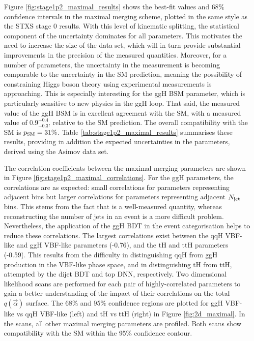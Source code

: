 Figure \ref{fig:stage1p2_maximal_results} shows the \xsbr best-fit values and 68\% confidence intervals in the maximal merging scheme, plotted in the same style as the STXS stage 0 results. With this level of kinematic splitting, the statistical component of the uncertainty dominates for all parameters. This motivates the need to increase the size of the data set, which will in turn provide substantial improvements in the precision of the measured quantities. Moreover, for a number of parameters, the uncertainty in the measurement is becoming comparable to the uncertainty in the SM prediction, meaning the possibility of constraining Higgs boson theory using experimental measurements is approaching. This is especially interesting for the ggH BSM parameter, which is particularly sensitive to new physics in the ggH loop. That said, the measured value of the ggH BSM \xsbr is in excellent agreement with the SM, with a measured value of $0.9^{+0.4}_{-0.3}$, relative to the SM prediction. The overall compatibility with the SM is $p_{\rm{SM}}=31\%$. Table \ref{tab:stage1p2_maximal_results} summarises these results, providing in addition the expected uncertainties in the parameters, derived using the Asimov data set. 

The correlation coefficients between the maximal merging parameters are shown in Figure \ref{fig:stage1p2_maximal_correlations}. For the ggH parameters, the correlations are as expected: small correlations for parameters representing adjacent \ptH bins but larger correlations for parameters representing adjacent $N_{\rm{jet}}$ bins. This stems from the fact that \ptgg is a well-measured quantity, whereas reconstructing the number of jets in an event is a more difficult problem. Nevertheless, the application of the ggH BDT in the event categorisation helps to reduce these correlations. The largest correlations exist between the qqH VBF-like and ggH VBF-like parameters (-0.76), and the tH and ttH parameters (-0.59). This results from the difficulty in distinguishing qqH from ggH production in the VBF-like phase space, and in distinguishing tH from ttH, attempted by the dijet BDT and top DNN, respectively. Two dimensional likelihood scans are performed for each pair of highly-correlated parameters to gain a better understanding of the impact of their correlations on the total $q(\vec{\alpha})$ surface. The 68\% and 95\% confidence regions are plotted for ggH VBF-like vs qqH VBF-like (left) and tH vs ttH (right) in Figure \ref{fig:2d_maximal}. In the scans, all other maximal merging parameters are profiled. Both scans show compatibility with the SM within the 95\% confidence contour.

